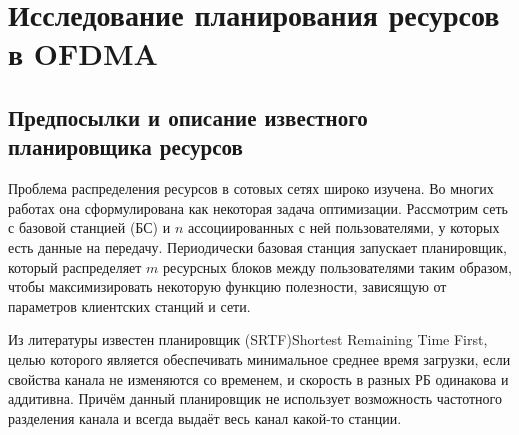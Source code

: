 \section{Исследование планирования ресурсов в OFDMA}
\label{sec:scheduler}

\subsection{Предпосылки и описание известного планировщика ресурсов}
Проблема распределения ресурсов в сотовых сетях широко изучена.
Во многих работах она сформулирована как некоторая задача оптимизации. 
Рассмотрим сеть с базовой станцией (БС) и $n$ ассоциированных с ней пользователями, у которых есть данные на передачу. 
Периодически базовая станция запускает планировщик, который распределяет $m$ ресурсных блоков между пользователями таким образом, чтобы максимизировать некоторую функцию полезности, зависящую от параметров клиентских станций и сети. 

Из литературы известен планировщик {\foreignlanguage{english}{(SRTF)Shortest Remaining Time First}}, целью которого является обеспечивать минимальное среднее время загрузки, если свойства канала не изменяются со временем, и скорость в разных РБ одинакова и аддитивна. Причём данный планировщик не использует возможность частотного разделения канала и всегда выдаёт весь канал какой-то станции. 


